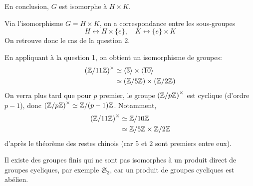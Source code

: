 {\begin{td-sol}[]
\begin{enumerate}
\begin{enumerate}
                En conclusion, \(G\) est isomorphe à \(H\times K\).

                \begin{remark}
                    Via l'isomorphisme \(G = H\times K\), on a correspondance
                    entre les sous-groupes
                    \begin{equation*}
                        H \leftrightarrow H\times\{e\},\quad K\leftrightarrow\{e\}\times K
                    \end{equation*}
                    On retrouve donc le cas de la question 2.
                \end{remark}

                \begin{remark}
                    En appliquant à la question 1, on obtient un isomorphisme
                    de groupes:
                    \begin{equation*}
                        \begin{aligned}
                            {\left(\mathbb{Z}/11\mathbb{Z}\right)}^\times 
                            &\simeq \langle \overline{3}\rangle\times\langle\overline{10}\rangle\\
                            &\simeq \left(\mathbb{Z}/5\mathbb{Z}\right)\times\left(\mathbb{Z}/2\mathbb{Z}\right)\\
                        \end{aligned}
                    \end{equation*}
                    On verra plus tard que pour \(p\) premier, le
                    groupe \({\left(\mathbb{Z}/p\mathbb{Z}\right)}^\times\) est cyclique (d'ordre \(p-1\)),
                    donc \({\left(\mathbb{Z}/p\mathbb{Z}\right)}^\times\simeq\mathbb{Z}/(p-1)\mathbb{Z}\). Notamment,
                    \begin{equation*}
                        \begin{aligned}
                            {\left(\mathbb{Z}/11\mathbb{Z}\right)}^\times
                            &\simeq\mathbb{Z}/10\mathbb{Z}\\
                            &\simeq\mathbb{Z}/5\mathbb{Z}\times\mathbb{Z}/2\mathbb{Z}
                        \end{aligned}
                    \end{equation*}
                    d'après le théorème des restes chinois (car \(5\) et \(2\) sont premiers entre eux).
                \end{remark}
                \begin{remark}
                    Il existe des groupes finis qui ne sont pas isomorphes à un produit direct 
                    de groupes cycliques, par exemple \(\mathfrak{S}_3\), car un produit
                    de groupes cycliques est abélien.


\end{remark}
\end{enumerate}
\end{enumerate}
\end{td-sol}}
